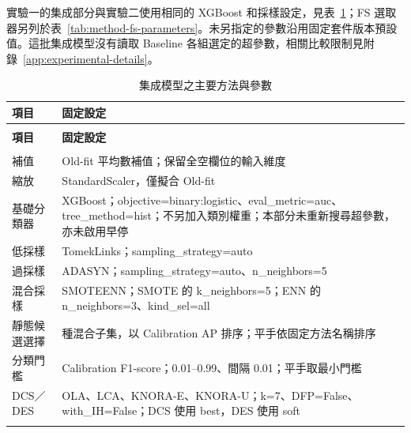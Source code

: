 實驗一的集成部分與實驗二使用相同的 XGBoost 和採樣設定，見表~\ref{tab:method-parameters}；FS 選取器另列於表~\ref{tab:method-fs-parameters}。未另指定的參數沿用固定套件版本預設值。這批集成模型沒有讀取 Baseline 各組選定的超參數，相關比較限制見附錄~\ref{app:experimental-details}。

\begingroup
\footnotesize
{}
\setlength{\tabcolsep}{4pt}
\renewcommand{\arraystretch}{1.25}
\setlength{\LTleft}{0pt plus 1fill}
\setlength{\LTright}{0pt plus 1fill}
\begin{longtable}{@{}>{\raggedright\arraybackslash}p{}>{\raggedright\arraybackslash}p{}@{}}
\caption{集成模型之主要方法與參數}\label{tab:method-parameters}\\
\toprule
\textbf{項目} & \textbf{固定設定} \\
\midrule
\endfirsthead
\multicolumn{2}{c}{表~\thetable（續）}\\
\toprule
\textbf{項目} & \textbf{固定設定} \\
\midrule
\endhead
\midrule
\multicolumn{2}{r}{續下頁}\\
\endfoot
\bottomrule
\endlastfoot
補值 & Old-fit 平均數補值；保留全空欄位的輸入維度 \\
\addlinespace[2pt]
縮放 & StandardScaler，僅擬合 Old-fit \\
\addlinespace[2pt]
基礎分類器 & XGBoost；{\normalfont objective=\allowbreak{}binary:logistic}、{\normalfont eval\_\allowbreak{}metric=\allowbreak{}auc}、{\normalfont tree\_\allowbreak{}method=\allowbreak{}hist}；不另加入類別權重；本部分未重新搜尋超參數，亦未啟用早停 \\
\addlinespace[2pt]
低採樣 & TomekLinks；{\normalfont sampling\_\allowbreak{}strategy=\allowbreak{}auto} \\
\addlinespace[2pt]
過採樣 & ADASYN；{\normalfont sampling\_\allowbreak{}strategy=\allowbreak{}auto}、{\normalfont n\_\allowbreak{}neighbors=\allowbreak{}5} \\
\addlinespace[2pt]
混合採樣 & SMOTEENN；SMOTE 的 {\normalfont k\_\allowbreak{}neighbors=\allowbreak{}5}；ENN 的 {\normalfont n\_\allowbreak{}neighbors=\allowbreak{}3}、{\normalfont kind\_\allowbreak{}sel=\allowbreak{}all} \\
\addlinespace[2pt]
靜態候選選擇 & 49 種混合子集，以 Calibration AP 排序；平手依固定方法名稱排序 \\
\addlinespace[2pt]
分類門檻 & Calibration F1-score；0.01–0.99、間隔 0.01；平手取最小門檻 \\
\addlinespace[2pt]
DCS／DES & OLA、LCA、KNORA-E、KNORA-U；{\normalfont k=\allowbreak{}7}、{\normalfont DFP=\allowbreak{}False}、{\normalfont with\_\allowbreak{}IH=\allowbreak{}False}；DCS 使用 {\normalfont best}，DES 使用 {\normalfont soft} \\*
\end{longtable}
\endgroup

